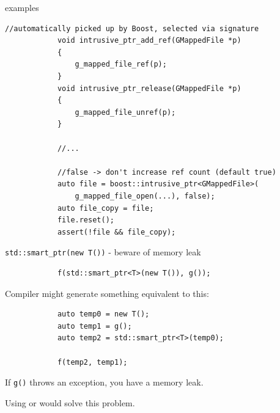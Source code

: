 	\begin{frame}[fragile=singleslide]{ examples}
		\begin{lstlisting}[gobble=12]
			//automatically picked up by Boost, selected via signature
			void intrusive_ptr_add_ref(GMappedFile *p)
			{
			    g_mapped_file_ref(p);
			}
			void intrusive_ptr_release(GMappedFile *p)
			{
			    g_mapped_file_unref(p);
			}
			
			//...
			
			//false -> don't increase ref count (default true)
			auto file = boost::intrusive_ptr<GMappedFile>(
			    g_mapped_file_open(...), false);
			auto file_copy = file;
			file.reset();
			assert(!file && file_copy);
		\end{lstlisting}
		
	\end{frame}
	
	\begin{frame}[fragile]{\lstinline|std::smart_ptr(new T())| - beware of memory leak}
		\begin{lstlisting}
			f(std::smart_ptr<T>(new T()), g());
		\end{lstlisting}
		
		\pause
		
		Compiler might generate something equivalent to this:
		
		\begin{lstlisting}
			auto temp0 = new T();
			auto temp1 = g();
			auto temp2 = std::smart_ptr<T>(temp0);
			
			f(temp2, temp1);
		\end{lstlisting}
		
		\pause
		
		If \lstinline|g()| throws an exception, you have a memory leak.
		
		Using  or  would solve this problem.
	\end{frame}
	
